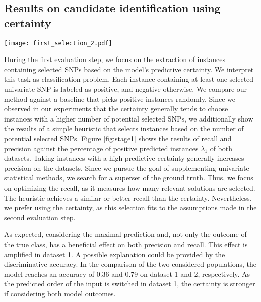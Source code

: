 \documentclass{article}
\begin{document}
\subsection{Results on candidate identification using certainty}
\begin{figure*}[t]
    \texttt{[image: first\_selection\_2.pdf]}
    \caption{The two upper plots show precision and recall of dataset 1 and the lower ones the results of dataset 2 on the candidate identification task. We plotted the measures against the percentage of positive classified instances to find a suitable $\lambda_{1}$ achieving for both recall and precision high values. $True$ chooses instances based on the true class model prediction and $Max$ selects instances based on equation \ref{eq:certainty}.}
    \label{fig:stage1}
\end{figure*}
During the first evaluation step, we focus on the extraction of instances containing selected SNPs based on the model's predictive certainty. We interpret this task as classification problem. Each instance containing at least one selected univariate SNP is labeled as positive, and negative otherwise. We compare our method against a baseline that picks positive instances randomly. Since we observed in our experiments that the certainty generally tends to choose instances with a higher number of potential selected SNPs, we additionally show the results of a simple heuristic that selects instances based on the number of potential selected SNPs. Figure \ref{fig:stage1} shows the results of recall and precision against the percentage of positive predicted instances $\lambda_{1}$ of both datasets. 
Taking instances with a high predictive certainty generally increases precision on the datasets. 
Since we pursue the goal of supplementing univariate statistical methods, we search for a superset of the ground truth. Thus, we focus on optimizing the recall, as it measures how many relevant solutions are selected. 
The heuristic achieves a similar or better recall than the certainty. Nevertheless, we prefer using the certainty, as this selection fits to the assumptions made in the second evaluation step.

As expected, considering the maximal prediction and, not only the outcome of the true class, has a beneficial effect on both precision and recall. This effect is amplified in dataset 1. A possible explanation could be provided by the discriminative accuracy. In the comparison of the two considered populations, the model reaches an accuracy of 0.36 and 0.79 on dataset 1 and 2, respectively. As the predicted order of the input is switched in dataset 1, the certainty is stronger if considering both model outcomes.
\end{document}
